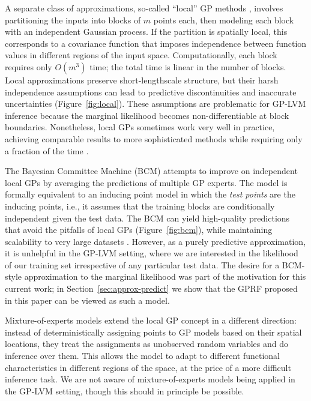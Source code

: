\documentclass{article}
\begin{document}
A separate class of approximations, so-called ``local'' GP methods
\cite{rasmussen2006, nguyen2009model, zhao2011human, park2011domain}, involves
partitioning the inputs into blocks of $m$ points each, then modeling
each block with an independent Gaussian process. If the partition is
spatially local, this corresponds to a covariance function that imposes independence
between function values in different regions of the input
space. Computationally, each block requires only $O(m^3)$ time; the
total time is linear in the number of blocks. Local approximations
preserve short-lengthscale structure, but their harsh independence assumptions can lead to
predictive discontinuities and inaccurate uncertainties
(Figure~\ref{fig:local}). These assumptions are problematic for
GP-LVM inference because the marginal likelihood becomes
non-differentiable at block boundaries. Nonetheless, local GPs sometimes
work very well in practice, achieving comparable results to more
sophisticated methods while requiring only a fraction of the time \cite{chalupka2012}.

The Bayesian Committee Machine (BCM) \cite{tresp2000bayesian} attempts
to improve on independent local GPs by averaging the predictions of
multiple GP experts. The model is formally equivalent to an inducing
point model in which the {\em test points} are the inducing points,
i.e., it assumes that the training blocks are conditionally
independent given the test data. The BCM can yield high-quality
predictions that avoid the pitfalls of local GPs
(Figure~\ref{fig:bcm}), while
maintaining scalability to very large datasets
\cite{deisenroth2015distributed}. However, as a purely predictive
approximation, it is unhelpful in the GP-LVM setting, where we are
interested in the likelihood of our training set irrespective of any
particular test data.  The desire for a BCM-style approximation to the
marginal likelihood was part of the motivation for this current work;
in Section~\ref{sec:approx-predict} we show that the GPRF proposed in this
paper can be viewed as such a model.

Mixture-of-experts models \cite{rasmussen2002infinite, nguyen2014fast}
extend the local GP concept in a different direction: instead of
deterministically assigning points to GP models based on their spatial
locations, they treat the assignments as unobserved random variables
and do inference over them. This allows the model to adapt to different
functional characteristics in different regions of the space, at the
price of a more difficult inference task. We are not aware of
mixture-of-experts models being applied in the GP-LVM setting, though
this should in principle be possible.
\end{document}
